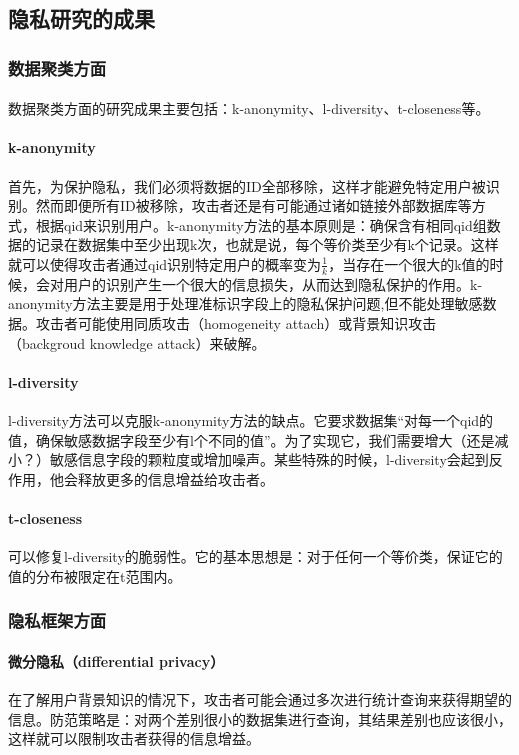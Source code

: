 \documentclass[12pt,a4paper]{article}
\begin{document}
\subsection{隐私研究的成果} 
\subsubsection{数据聚类方面}
\paragraph{} 数据聚类方面的研究成果主要包括：k-anonymity、l-diversity、t-closeness等。
\paragraph{k-anonymity} 首先，为保护隐私，我们必须将数据的ID全部移除，这样才能避免特定用户被识别。然而即便所有ID被移除，攻击者还是有可能通过诸如链接外部数据库等方式，根据qid来识别用户。k-anonymity方法的基本原则是：确保含有相同qid组数据的记录在数据集中至少出现k次，也就是说，每个等价类至少有k个记录。这样就可以使得攻击者通过qid识别特定用户的概率变为$\frac{1}{k}$，当存在一个很大的k值的时候，会对用户的识别产生一个很大的信息损失，从而达到隐私保护的作用。k-anonymity方法主要是用于处理准标识字段上的隐私保护问题,但不能处理敏感数据。攻击者可能使用同质攻击（homogeneity attach）或背景知识攻击（backgroud knowledge attack）来破解。
\paragraph{l-diversity} l-diversity方法可以克服k-anonymity方法的缺点。它要求数据集“对每一个qid的值，确保敏感数据字段至少有l个不同的值”。为了实现它，我们需要增大（还是减小？）敏感信息字段的颗粒度或增加噪声。某些特殊的时候，l-diversity会起到反作用，他会释放更多的信息增益给攻击者。
\paragraph{t-closeness} 可以修复l-diversity的脆弱性。它的基本思想是：对于任何一个等价类，保证它的值的分布被限定在t范围内。

\subsubsection{隐私框架方面}
\paragraph{微分隐私（differential privacy）} 在了解用户背景知识的情况下，攻击者可能会通过多次进行统计查询来获得期望的信息。防范策略是：对两个差别很小的数据集进行查询，其结果差别也应该很小，这样就可以限制攻击者获得的信息增益。
\end{document}
